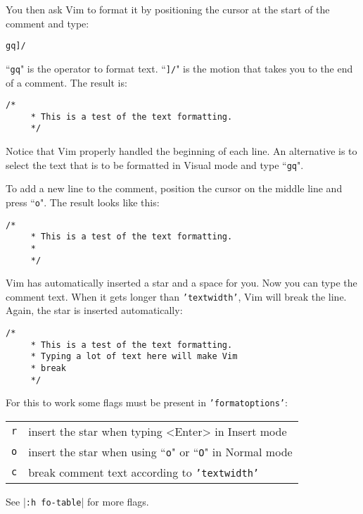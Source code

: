 You then ask Vim to format it by positioning the cursor at the start of the comment and type:

\begin{Verbatim}[samepage=true]
 gq]/
\end{Verbatim}

``\texttt{gq}" is the operator to format text.
``\texttt{]/}" is the motion that takes you to the end of a comment.
The result is:

\begin{Verbatim}[samepage=true]
    /*
     * This is a test of the text formatting.
     */
\end{Verbatim}

Notice that Vim properly handled the beginning of each line.
An alternative is to select the text that is to be formatted in Visual mode and type ``\texttt{gq}".

To add a new line to the comment, position the cursor on the middle line and press ``\texttt{o}".
The result looks like this:

\begin{Verbatim}[samepage=true]
    /*
     * This is a test of the text formatting.
     *
     */
\end{Verbatim}

Vim has automatically inserted a star and a space for you.
Now you can type the comment text.
When it gets longer than \texttt{'textwidth'}, Vim will break the line.
Again, the star is inserted automatically:

\begin{Verbatim}[samepage=true]
    /*
     * This is a test of the text formatting.
     * Typing a lot of text here will make Vim
     * break
     */
\end{Verbatim}

For this to work some flags must be present in \texttt{'formatoptions'}:

\begin{center} \begin{tabular}{c l}
\texttt{r} & insert the star when typing <Enter> in Insert mode \\
\texttt{o} & insert the star when using ``\texttt{o}" or ``\texttt{O}" in Normal mode \\
\texttt{c} & break comment text according to \texttt{'textwidth'} \\
\end{tabular} \end{center}

See |\texttt{:h fo-table}| for more flags.

